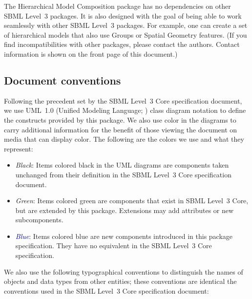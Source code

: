 The Hierarchical Model Composition package has no dependencies on other
SBML Level~3 packages.  It is also designed with the goal of being able
to work seamlessly with other SBML Level~3 packages.  For example, one
can create a set of hierarchical models that also use Groups or Spatial
Geometry features.  (If you find incompatibilities with other packages,
please contact the authors.  Contact information is shown on the front
page of this document.)


\subsection{Document conventions}
\label{conventions}

Following the precedent set by the SBML Level~3 Core specification
document, we use UML~1.0 (Unified Modeling Language;
\citealt{eriksson:1998,oestereich:1999}) class diagram notation to
define the constructs provided by this package.  We also use color in
the diagrams to carry additional information for the benefit of those
viewing the document on media that can display color.  The following are
the colors we use and what they represent:

\begin{itemize}

\item[\raisebox{2.75pt}{\colorbox{black}{\rule{0.8pt}{0.8pt}}}]
  \emph{Black}: Items colored black in the UML diagrams are components
  taken unchanged from their definition in the SBML Level~3 Core
  specification document.

\item[\raisebox{2.75pt}{\colorbox{mediumgreen}{\rule{0.8pt}{0.8pt}}}]
  \emph{\textcolor{mediumgreen}{Green}}: Items colored green are
  components that exist in SBML Level~3 Core, but are extended by this
  package.  Extensions may add attributes or new subcomponents.

\item[\raisebox{2.75pt}{\colorbox{darkblue}{\rule{0.8pt}{0.8pt}}}]
  \emph{\textcolor{darkblue}{Blue}}: Items colored blue are new
  components introduced in this package specification.  They have no
  equivalent in the SBML Level~3 Core specification.

\end{itemize}

We also use the following typographical conventions to distinguish the
names of objects and data types from other entities; these conventions
are identical the conventions used in the SBML Level~3 Core specification
document:

